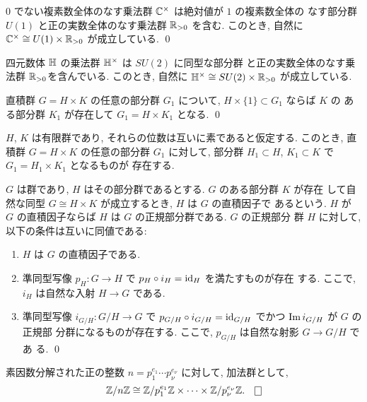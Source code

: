 \documentclass[12pt,twoside]{jarticle}
\def\id{\text{\rm id}}
\def\Z{{\Bbb Z}} %
\def\R{{\Bbb R}} %
\def\C{{\Bbb C}} %
\def\Im{\mathop{\text{\rm Im}}\nolimits}     %
\def\isom{\cong}
\begin{document}
\begin{question}
  $0$ でない複素数全体のなす乗法群 $\C^\times$ は絶対値が $1$ の複素数全体の
  なす部分群 $U(1)$ と正の実数全体のなす乗法群 $\R_{>0}$ を含む. このとき, 
  自然に $\C^\times \isom U(1) \times \R_{>0}$ が成立している. \qed
\end{question}

\begin{question}
  四元数体 ${\Bbb H}$ の乗法群 ${\Bbb H}^\times$ は $SU(2)$ に同型な部分群
  と正の実数全体のなす乗法群 $\R_{>0}$を含んでいる. このとき, 
  自然に ${\Bbb H}^\times \isom SU(2)\times\R_{>0}$ が成立している.
\end{question}

\begin{question}
  直積群 $G=H\times K$ の任意の部分群 $G_1$ について,
  $H\times\{1\}\subset G_1$ ならば  $K$ の
  ある部分群 $K_1$ が存在して $G_1=H\times K_1$ となる. \qed
\end{question}

\begin{question}
  $H$, $K$ は有限群であり, それらの位数は互いに素であると仮定する.
  このとき, 直積群 $G = H\times K$ の任意の部分群 $G_1$ に対して,
  部分群 $H_1\subset H$, $K_1\subset K$ で $G_1=H_1\times K_1$ となるものが
  存在する.
\end{question}

\begin{question}[直積因子]
  $G$ は群であり, $H$ はその部分群であるとする. $G$ のある部分群 $K$ が存在
  して自然な同型 $G\isom H\times K$ が成立するとき, $H$ は $G$ の直積因子で
  あるという. 
  $H$ が $G$ の直積因子ならば $H$ は $G$ の正規部分群である. $G$ の正規部分
  群 $H$ に対して, 以下の条件は互いに同値である:
  \begin{enumerate}
  \item $H$ は $G$ の直積因子である.
  \item 準同型写像 $p_H:G\to H$ で $p_H\circ i_H = \id_H$ を満たすものが存在
    する. ここで, $i_H$ は自然な入射 $H\to G$ である.
  \item 準同型写像 $i_{G/H}:G/H\to G$ で %
    $p_{G/H}\circ i_{G/H} = \id_{G/H}$ でかつ $\Im i_{G/H}$ が $G$ の正規部
    分群になるものが存在する. ここで, $p_{G/H}$ は自然な射影 $G\to G/H$ であ
    る.
    \qed
  \end{enumerate}
\end{question}

\begin{question}
  素因数分解された正の整数 $n=p_1^{e_1}\cdots p_\nu^{e_\nu}$ に対して,
  加法群として, 
  \begin{equation*}
    \Z/n\Z \isom \Z/p_1^{e_1}\Z \times \dots \times \Z/p_\nu^{e_\nu}\Z.
    \qed
  \end{equation*}
\end{question}
\end{document}
